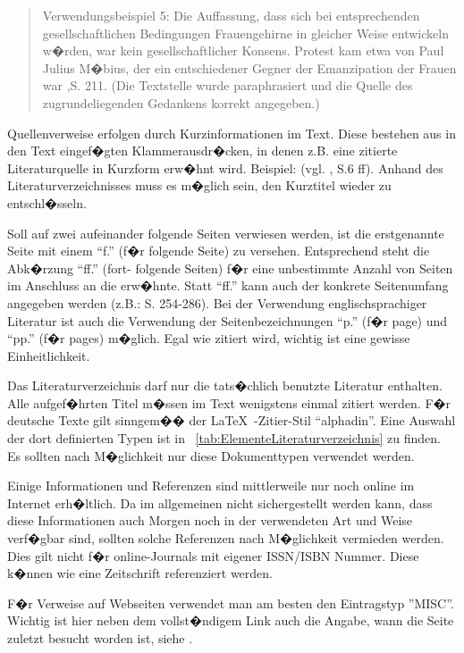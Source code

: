 \begin{quote}
Verwendungsbeispiel 5: Die Auffassung, dass sich bei entsprechenden gesellschaftlichen Bedingungen Frauengehirne in gleicher Weise entwickeln w�rden, war kein gesellschaftlicher Konsens. Protest kam etwa von Paul Julius M�bius, der ein entschiedener Gegner der Emanzipation der Frauen war \cite{Voss2011},S. 211. (Die Textstelle wurde paraphrasiert und die Quelle des zugrundeliegenden Gedankens korrekt angegeben.)

\end{quote}


Quellenverweise erfolgen durch Kurzinformationen im Text. Diese bestehen aus in den Text
eingef�gten Klammerausdr�cken, in denen z.B. eine zitierte Literaturquelle in Kurzform erw�hnt
wird. Beispiel: (vgl. \cite{Schiller:Tell}, S.6 ff). Anhand des Literaturverzeichnisses muss es
m�glich sein, den Kurztitel wieder zu entschl�sseln.

Soll auf zwei aufeinander folgende Seiten verwiesen werden, ist die erstgenannte Seite mit einem
"`f."' (f�r folgende Seite) zu versehen. Entsprechend steht die Abk�rzung "`ff."' (fort- folgende
Seiten) f�r eine unbestimmte Anzahl von Seiten im Anschluss an die erw�hnte. Statt "`ff."' kann
auch der konkrete Seitenumfang angegeben werden (z.B.: S. 254-286). Bei der Verwendung
englischsprachiger Literatur ist auch die Verwendung der Seitenbezeichnungen "`p."' (f�r page) und
"`pp."' (f�r pages) m�glich. Egal wie zitiert wird, wichtig ist eine gewisse Einheitlichkeit.


Das Literaturverzeichnis darf nur die tats�chlich benutzte Literatur enthalten. Alle aufgef�hrten
Titel m�ssen im Text wenigstens einmal zitiert werden. F�r deutsche Texte gilt sinngem�� der
\LaTeX\ -Zitier-Stil "`alphadin"'. Eine Auswahl der dort definierten Typen ist in
\tablename~\ref{tab:ElementeLiteraturverzeichnis} zu finden. Es sollten nach M�glichkeit nur diese
Dokumenttypen verwendet werden.

Einige Informationen und Referenzen sind mittlerweile nur noch online im Internet erh�ltlich. Da im
allgemeinen nicht sichergestellt werden kann, dass diese Informationen auch Morgen noch in der
verwendeten Art und Weise verf�gbar sind, sollten solche Referenzen nach M�glichkeit vermieden
werden. Dies gilt nicht f�r online-Journals mit eigener ISSN/ISBN Nummer. Diese k�nnen wie eine Zeitschrift referenziert werden.

F�r Verweise auf Webseiten verwendet man am besten den Eintragstyp ''MISC''. Wichtig ist hier neben
dem vollst�ndigem Link auch die Angabe, wann die Seite zuletzt besucht worden ist, siehe
\cite{medit2007}.

